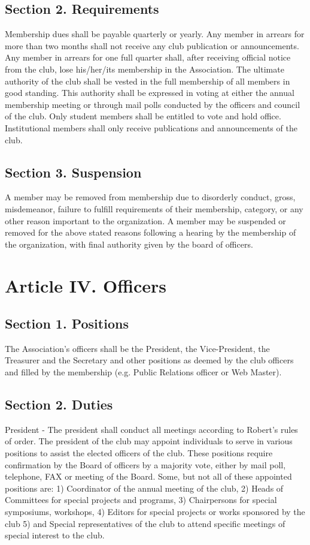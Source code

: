 \documentclass{article}
\begin{document}
  \subsection{Section 2. Requirements}
  Membership dues shall be payable quarterly or yearly. Any member in arrears for more than two months shall not receive any club publication or announcements. Any member in arrears for one full quarter shall, after receiving official notice from the club, lose his/her/its membership in the Association. The ultimate authority of the club shall be vested in the full membership of all members in good standing. This authority shall be expressed in voting at either the annual membership meeting or through mail polls conducted by the officers and council of the club. Only student members shall be entitled to vote and hold office. Institutional members shall only receive publications and announcements of the club.

  \subsection{Section 3. Suspension}
  A member may be removed from membership due to disorderly conduct, gross, misdemeanor, failure to fulfill requirements of their membership, category, or any other reason important to the organization. A member may be suspended or removed for the above stated reasons following a hearing by the membership of the organization, with final authority given by the board of officers.

\section{Article IV. Officers}
  \subsection{Section 1. Positions}
  The Association’s officers shall be the President, the Vice-President, the Treasurer and the Secretary and other positions as deemed by the club officers and filled by the membership (e.g. Public Relations officer or Web Master).

  \subsection{Section 2. Duties}
  President - The president shall conduct all meetings according to Robert's rules of order. The president of the club may appoint individuals to serve in various positions to assist the elected officers of the club. These positions require confirmation by the Board of officers by a majority vote, either by mail poll, telephone, FAX or meeting of the Board. Some, but not all of these appointed positions are:
1) Coordinator of the annual meeting of the club, 2) Heads of Committees for special projects and programs, 3) Chairpersons for special symposiums, workshops, 4) Editors for special projects or works sponsored by the club 5) and Special representatives of the club to attend specific meetings of special interest to the club.
\end{document}
